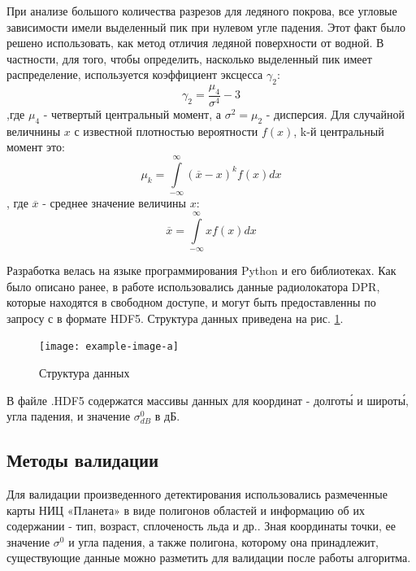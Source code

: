 При анализе большого количества разрезов для ледяного покрова, все  угловые зависимости имели выделенный пик при нулевом
угле падения. Этот факт было решено использовать, как метод отличия ледяной поверхности от водной. В частности, для
того, чтобы определить, насколько выделенный пик имеет распределение, используется коэффициент эксцесса $\gamma_2$:
\begin{equation}
  \gamma_2 = \frac{\mu_4}{\sigma^4} -3
  \label{eq:5}
\end{equation}
,где $\mu_4$ - четвертый центральный момент, а $\sigma^2 = \mu_2$ - дисперсия. Для случайной величнины $x$ с известной плотностью вероятности $f(x)$, k-й
центральный момент это:
\begin{equation}
  \mu_k = \int \limits_{-\infty}^{\infty}(\overline{x}-x)^k f(x) dx
  \label{eq:6}
\end{equation} 
, где $\overline{x}$ - среднее значение величины $x$:
\begin{equation}
  \overline{x} = \int \limits_{-\infty}^{\infty}x f(x) dx
  \label{eq:7}
\end{equation}

 

Разработка велась на языке программирования Python и его библиотеках. Как было описано ранее, в работе использовались
данные радиолокатора DPR, которые находятся в свободном доступе, и могут
быть предоставленны по запросу с \cite{data} в формате HDF5. Структура данных приведена на рис. \ref{fig:5}.

\begin{figure}[h!]
  \centering
  \texttt{[image: example-image-a]}
  \caption{Структура данных}
  \label{fig:5}
\end{figure}

В файле .HDF5 содержатся массивы данных для координат - долгот\'{ы} и широт\'{ы}, угла падения, и значение $\sigma^0_{dB}$ в
дБ. 

\subsection{Методы валидации}

Для валидации произведенного детектирования использовались размеченные карты НИЦ «Планета» в виде полигонов областей и информацию об их содержании
- тип, возраст, сплоченость льда и др.. Зная координаты точки, ее значение $\sigma^0$ и угла падения, а также полигона,
которому она принадлежит, существующие данные можно разметить для валидации после работы алгоритма. 

